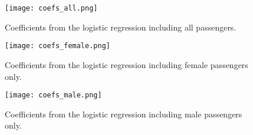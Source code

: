 \documentclass[12pt, letterpaper]{article}
\begin{document}
\begin{figure}[H]
    \centering
    \texttt{[image: coefs\_all.png]}
    \caption{Coefficients from the logistic regression including all passengers.}
    \label{fig:coef_all}
\end{figure}

\begin{figure}[H]
    \centering
    \texttt{[image: coefs\_female.png]}
    \caption{Coefficients from the logistic regression including female passengers only.}
    \label{fig:coef_female}
\end{figure}


\begin{figure}[H]
    \centering
    \texttt{[image: coefs\_male.png]}
    \caption{Coefficients from the logistic regression including male passengers only.}
    \label{fig:coef_male}
\end{figure}
\end{document}
